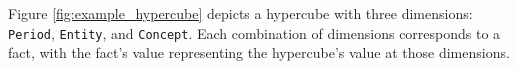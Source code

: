 Figure \ref{fig:example_hypercube} depicts a hypercube with three dimensions: \texttt{Period}, \texttt{Entity}, and \texttt{Concept}.
Each combination of dimensions corresponds to a fact, with the fact's value representing the hypercube's value at those dimensions.









